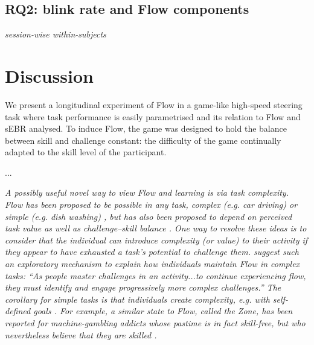 \documentclass[10pt,letterpaper,floatsintext]{article}
\begin{document}
\subsection*{RQ2: blink rate and Flow components}
{\it session-wise within-subjects}



\section{Discussion}
We present a longitudinal experiment of Flow in a game-like high-speed steering task where task performance is easily parametrised and its relation to Flow and sEBR analysed. %
To induce Flow, the game was designed to hold the balance between skill and challenge constant: the difficulty of the game continually adapted to the skill level of the participant.

...

{\it A possibly useful novel way to view Flow and learning is via task complexity. Flow has been proposed to be possible in {\it any} task, complex (e.g. car driving) or simple (e.g. dish washing) \cite{Csikszentmihalyi1999}, but has also been proposed to depend on perceived task value as well as challenge--skill balance \cite{Keller2012}. One way to resolve these ideas is to consider that the individual can {\it introduce} complexity (or value) to their activity if they appear to have exhausted a task's potential to challenge them. \cite{Nakamura2002} suggest such an exploratory mechanism to explain how individuals maintain Flow in complex tasks: ``As people master challenges in an activity...to continue experiencing flow, they must identify and engage progressively more complex challenges.'' The corollary for simple tasks is that individuals {\it create} complexity, e.g. with self-defined goals \cite{Rauterberg1995}. For example, a similar state to Flow, called the Zone, has been reported for machine-gambling addicts whose pastime is in fact skill-free, but who nevertheless believe that they are skilled \cite{Schull2014}.}
\end{document}
